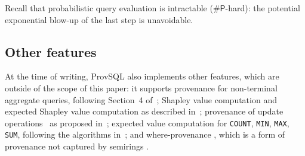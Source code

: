 Recall that probabilistic query evaluation is intractable
($\mathsf{\#P}$-hard):
the potential exponential blow-up of the last step is
unavoidable.

\subsection{Other features}
At the time of writing, ProvSQL also implements other features,
which
are outside of the scope of this paper: it supports provenance for
non-terminal aggregate queries, following Section~4
of~\cite{amsterdamer2011provenance}; Shapley value
computation and expected Shapley value computation as described
in~\cite{DBLP:journals/pacmmod/KarmakarMSB24}; provenance of update
operations~\cite{widiaatmaja2025demonstration} as proposed in~\cite{DBLP:conf/sigmod/BourhisDM20}; expected
value computation for \texttt{COUNT}, \texttt{MIN},
\texttt{MAX}, \texttt{SUM}, following the algorithms
in~\cite{abiteboul2011capturing}; and where-provenance
\cite{bunemankt01,senellart2018provsql}, which is a form of provenance not captured by
semirings \cite{DBLP:journals/ftdb/CheneyCT09}.
